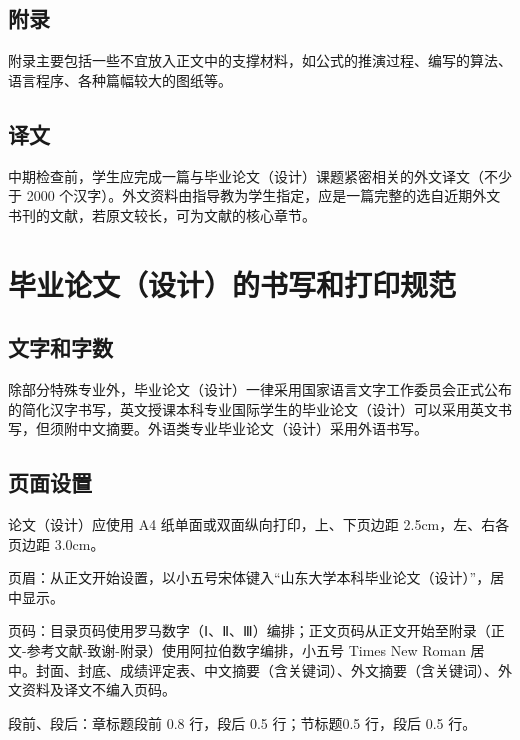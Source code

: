 \subsection{附录}
附录主要包括一些不宜放入正文中的支撑材料，如公式的推演过程、编写的算法、语言程序、各种篇幅较大的图纸等。
\subsection{译文}
中期检查前，学生应完成一篇与毕业论文（设计）课题紧密相关的外文译文（不少于 2000 个汉字）。外文资料由指导教为学生指定，应是一篇完整的选自近期外文书刊的文献，若原文较长，可为文献的核心章节。
\section{毕业论文（设计）的书写和打印规范}
\subsection{文字和字数}
除部分特殊专业外，毕业论文（设计）一律采用国家语言文字工作委员会正式公布的简化汉字书写，英文授课本科专业国际学生的毕业论文（设计）可以采用英文书写，但须附中文摘要。外语类专业毕业论文（设计）采用外语书写。
\subsection{页面设置}
论文（设计）应使用 A4 纸单面或双面纵向打印，上、下页边距 2.5cm，左、右各页边距 3.0cm。

页眉：从正文开始设置，以小五号宋体键入“山东大学本科毕业论文（设计）”，居中显示。

页码：目录页码使用罗马数字（Ⅰ、Ⅱ、Ⅲ）编排；正文页码从正文开始至附录（正文-参考文献-致谢-附录）使用阿拉伯数字编排，小五号 Times New Roman 居中。封面、封底、成绩评定表、中文摘要（含关键词）、外文摘要（含关键词）、外文资料及译文不编入页码。

段前、段后：章标题段前 0.8 行，段后 0.5 行；节标题0.5 行，段后 0.5 行。

